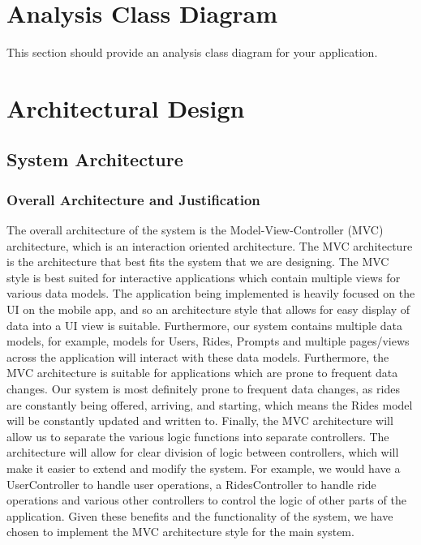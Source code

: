 \documentclass[]{article}
\begin{document}


\section{Analysis Class Diagram}
\label{sec:analysis_class_diagram}
This section should provide an analysis class diagram for your application.


\section{Architectural Design}
\label{sec:architectural_design}

\subsection{System Architecture}
\label{sub:system_architecture}
\subsubsection{Overall Architecture and Justification}
\label{subsub:overall_architecture}
The overall architecture of the system is the Model-View-Controller (MVC) architecture, which is an interaction 
oriented architecture. The MVC architecture is the architecture that best fits the system that we are designing. The MVC style is best suited for 
interactive applications which contain multiple views for various data models. The application being implemented is heavily focused on the UI 
on the mobile app, and so an architecture style that allows for easy display of data into a UI view is suitable. Furthermore, our system contains multiple data models, for example, models for Users, 
Rides, Prompts and multiple pages/views across the application will interact with these data models. Furthermore, the MVC architecture is suitable for 
applications which are prone to frequent data changes. Our system is most definitely prone to frequent data changes, as rides are constantly being offered, 
arriving, and starting, which means the Rides model will be constantly updated and written to. Finally, the MVC architecture will allow us to separate the 
various logic functions into separate controllers. The architecture will allow for clear division of logic between controllers, which will make it easier 
to extend and modify the system. For example, we would have a UserController to handle user operations, a RidesController to handle ride operations and various 
other controllers to control the logic of other parts of the application. Given these benefits and the functionality of the system, we have chosen to implement 
the MVC architecture style for the main system.
\end{document}
